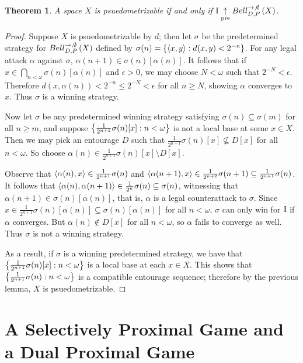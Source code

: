 \documentclass{amsart}
\newtheorem{theorem}{Theorem}[section]
\theoremstyle{definition}
\begin{document}
\begin{theorem}
A space \(X\) is psuedometrizable
if and only if 
\(\mathrm{I}\underset{\text{pre}}{\uparrow}Bell_{D,P}^{\to,\emptyset}\left({X}\right)\). 
\end{theorem}
\begin{proof}
Suppose \(X\) is psuedometrizable by \(d\);
then let \(\sigma\) be the predetermined strategy for \(Bell_{D,P}^{\to,\emptyset}\left({X}\right)\) defined by
\(\sigma(n)=\left\{\left\langle x,y\right\rangle:d(x,y)<2^{-n}\right\}\). 
For any legal attack \(\alpha\) against \(\sigma\), \(\alpha(n+1)\in\sigma(n)[\alpha(n)]\).
It follows that if \(x\in\bigcap_{n<\omega}\sigma(n)[\alpha(n)]\) and \(\epsilon>0\),
we may choose \(N<\omega\) such that \(2^{-N}<\epsilon\). Therefore 
\(d(x,\alpha(n))<2^{-n}\leq 2^{-N}<\epsilon\) for all \(n\geq N\), showing \(\alpha\) converges
to \(x\). Thus \(\sigma\) is a winning strategy.

Now let \(\sigma\) be any predetermined winning strategy satisfying \(\sigma(n)\subseteq\sigma(m)\)
for all \(n\geq m\), and suppose \(\left\{\frac{1}{2^{n+1}}\sigma(n)[x]:n<\omega\right\}\) is not a
local base at some \(x\in X\). Then we may pick an entourage \(D\) such that
\(\frac{1}{2^{n+1}}\sigma(n)[x]\not\subseteq D[x]\) for all \(n<\omega\). So choose
\(\alpha(n)\in\frac{1}{2^{n+1}}\sigma(n)[x]\setminus D[x]\).

Observe that \(\left\langle \alpha(n),x\right\rangle\in\frac{1}{2^{n+1}}\sigma(n)\) and
\(\left\langle \alpha(n+1),x\right\rangle\in\frac{1}{2^{n+2}}\sigma(n+1)\subseteq\frac{1}{2^{n+1}}\sigma(n)\).
It follows that \(\left\langle \alpha(n),\alpha(n+1)\right\rangle\in\frac{1}{2^n}\sigma(n)\subseteq\sigma(n)\),
witnessing that \(\alpha(n+1)\in\sigma(n)[\alpha(n)]\), that is, \(\alpha\) is a legal counterattack
to \(\sigma\). Since \(x\in\frac{1}{2^{n+1}}\sigma(n)[\alpha(n)]\subseteq\sigma(n)[\alpha(n)]\)
for all \(n<\omega\), \(\sigma\) can only win for \(\mathrm{I}\) if \(\alpha\) converges.
But \(\alpha(n)\not\in D[x]\) for all \(n<\omega\), so \(\alpha\) fails to converge as well.
Thus \(\sigma\) is not a winning strategy.

As a result, if \(\sigma\) is a winning predetermined strategy,
we have that \(\left\{\frac{1}{2^{n+1}}\sigma(n)[x]:n<\omega\right\}\) is a
local base at each \(x\in X\). 
This shows that \(\left\{\frac{1}{2^{n+1}}\sigma(n):n<\omega\right\}\)
is a compatible entourage sequence; therefore by the previous lemma,
\(X\) is psuedometrizable.
\end{proof}

\section{A Selectively Proximal Game and a Dual Proximal Game}
\end{document}
